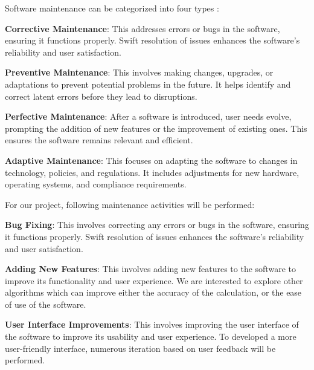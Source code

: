 Software maintenance can be categorized into four types \cite{Bhatt04}\cite{geeksforgeeks_2023b}:

\textbf{Corrective Maintenance}: This addresses errors or bugs in the software, ensuring it functions properly. Swift resolution of issues enhances the software's reliability and user satisfaction.

\textbf{Preventive Maintenance}: This involves making changes, upgrades, or adaptations to prevent potential problems in the future. It helps identify and correct latent errors before they lead to disruptions.

\textbf{Perfective Maintenance}: After a software is introduced, user needs evolve, prompting the addition of new features or the improvement of existing ones. This ensures the software remains relevant and efficient.

\textbf{Adaptive Maintenance}: This focuses on adapting the software to changes in technology, policies, and regulations. It includes adjustments for new hardware, operating systems, and compliance requirements.

For our project, following maintenance activities will be performed:

\textbf{Bug Fixing}: This involves correcting any errors or bugs in the software, ensuring it functions properly. Swift resolution of issues enhances the software's reliability and user satisfaction.

\textbf{Adding New Features}: This involves adding new features to the software to improve its functionality and user experience. We are interested to explore other algorithms which can improve either the accuracy of the calculation, or the ease of use of the software.

\textbf{User Interface Improvements}: This involves improving the user interface of the software to improve its usability and user experience. To developed a more user-friendly interface, numerous iteration based on user feedback will be performed.

